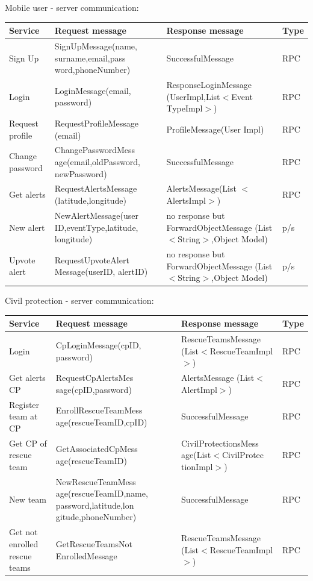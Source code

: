 \documentclass[a4paper,12pt]{report}
\begin{document}
Mobile user - server communication:

\begin{center}
\begin{tabular}{ |p{4cm}|p{4cm}|p{4cm}|p{2cm}| } 
\hline
Service 			& Request message 	& Response message		& Type 	\\
\hline
Sign Up  			& SignUpMessage(name, surname,email,pass word,phoneNumber)		& SuccessfulMessage 	& RPC	\\ 
Login 				& LoginMessage(email, password) 	& ResponseLoginMessage (UserImpl,List$<$Event TypeImpl$>$)	& RPC	\\ 
Request profile 	& RequestProfileMessage (email)		& ProfileMessage(User Impl)	& RPC	\\ 
Change password		& ChangePasswordMess age(email,oldPassword, newPassword)	& SuccessfulMessage	& RPC	\\
Get alerts		& RequestAlertsMessage (latitude,longitude)	& AlertsMessage(List $<$AlertsImpl$>$)	& RPC	\\
New alert		& NewAlertMessage(user ID,eventType,latitude, longitude)	& no response but ForwardObjectMessage (List$<$String$>$,Object Model)	& p/s	\\
Upvote alert		& RequestUpvoteAlert Message(userID, alertID)	& no response but ForwardObjectMessage (List$<$String$>$,Object Model)	& p/s	\\
\hline
\end{tabular}
\end{center}

Civil protection - server communication:

\begin{center}
\begin{tabular}{ |p{4cm}|p{4cm}|p{4cm}|p{2cm}| } 
\hline
Service 			& Request message 	& Response message		& Type 	\\
\hline
Login	& CpLoginMessage(cpID, password)	& RescueTeamsMessage (List$<$RescueTeamImpl$>$) 	& RPC	\\ 
Get alerts CP	& RequestCpAlertsMes sage(cpID,password)	& AlertsMessage (List$<$AlertImpl$>$) 	& RPC	\\ 
Register team at CP		& EnrollRescueTeamMess age(rescueTeamID,cpID)	& SuccessfulMessage & RPC	\\ 
Get CP of rescue team 	& GetAssociatedCpMess age(rescueTeamID)		& CivilProtectionsMess age(List$<$CivilProtec tionImpl$>$)	& RPC	\\ 
New team	& NewRescueTeamMess age(rescueTeamID,name, password,latitude,lon gitude,phoneNumber)	& SuccessfulMessage	& RPC	\\
Get not enrolled rescue teams & GetRescueTeamsNot EnrolledMessage	& RescueTeamsMessage (List$<$RescueTeamImpl$>$)	& RPC	\\
\hline
\end{tabular}
\end{center}
\end{document}
